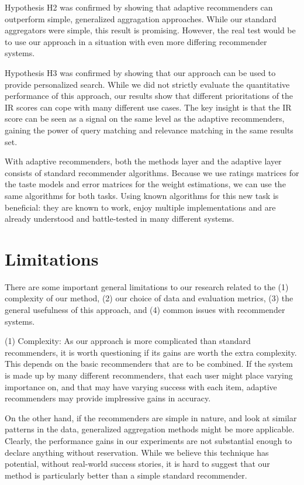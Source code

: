 Hypothesis H2 was confirmed by showing that adaptive recommenders
can outperform simple, generalized aggragation approaches.
While our standard aggregators were simple,
this result is promising.
However, the real test would be to use our approach
in a situation with even more differing recommender systems.

Hypothesis H3 was confirmed by showing that our approach
can be used to provide personalized search.
While we did not strictly evaluate the quantitative performance
of this approach, our results show that different
prioritations of the IR scores can cope with many different use cases.
The key insight is that the IR score can be seen as a signal
on the same level as the adaptive recommenders,
gaining the power of query matching and relevance matching
in the same results set.

With adaptive recommenders, both the methods layer and the adaptive layer consists of standard recommender algorithms.
Because we use ratings matrices for the taste models and error matrices for the weight estimations,
we can use the same algorithms for both tasks.
Using known algorithms for this new task is beneficial:
they are known to work, enjoy multiple implementations
and are already understood and battle-tested in many different systems.


\section{Limitations}

There are some important general limitations to our research
related to the 
(1) complexity of our method, 
(2) our choice of data and evaluation metrics, 
(3) the general usefulness of this approach, and
(4) common issues with recommender systems.

(1) Complexity: As our approach is more complicated than standard recommenders,
it is worth questioning if its gains are worth the extra complexity.
This depends on the basic recommenders that are to be combined.
If the system is made up by many different recommenders,
that each user might place varying importance on,
and that may have varying success with each item,
adaptive recommenders may provide implressive gains in accuracy.

On the other hand, if the recommenders are simple in nature,
and look at similar patterns in the data,
generalized aggregation methods might be more applicable.
Clearly, the performance gains in our experiments
are not substantial enough to declare anything without reservation.
While we believe this technique has potential,
without real-world success stories, it is hard
to suggest that our method is particularly better
than a simple standard recommender.

